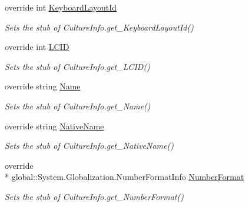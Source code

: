 \begin{DoxyCompactItemize}
override int \hyperlink{class_system_1_1_globalization_1_1_fakes_1_1_stub_culture_info_a1a2036b4fec133eff8bfeeba7706bf24}{Keyboard\-Layout\-Id}
\begin{DoxyCompactList}\small\item\em Sets the stub of Culture\-Info.\-get\-\_\-\-Keyboard\-Layout\-Id()\end{DoxyCompactList}\item 
override int \hyperlink{class_system_1_1_globalization_1_1_fakes_1_1_stub_culture_info_a61eef5bda2b932a11aa7154e59acd36b}{L\-C\-I\-D}
\begin{DoxyCompactList}\small\item\em Sets the stub of Culture\-Info.\-get\-\_\-\-L\-C\-I\-D()\end{DoxyCompactList}\item 
override string \hyperlink{class_system_1_1_globalization_1_1_fakes_1_1_stub_culture_info_a7484ca1485c94ee3f69e36cc43ad53f1}{Name}
\begin{DoxyCompactList}\small\item\em Sets the stub of Culture\-Info.\-get\-\_\-\-Name()\end{DoxyCompactList}\item 
override string \hyperlink{class_system_1_1_globalization_1_1_fakes_1_1_stub_culture_info_aee01bafbc982a0fd5cad5d8d140f66c5}{Native\-Name}
\begin{DoxyCompactList}\small\item\em Sets the stub of Culture\-Info.\-get\-\_\-\-Native\-Name()\end{DoxyCompactList}\item 
override \\*
global\-::\-System.\-Globalization.\-Number\-Format\-Info \hyperlink{class_system_1_1_globalization_1_1_fakes_1_1_stub_culture_info_a0a75c5714e81adad558c8c79e43da5ac}{Number\-Format}
\begin{DoxyCompactList}\small\item\em Sets the stub of Culture\-Info.\-get\-\_\-\-Number\-Format()\end{DoxyCompactList}\item 

\end{DoxyCompactItemize}

